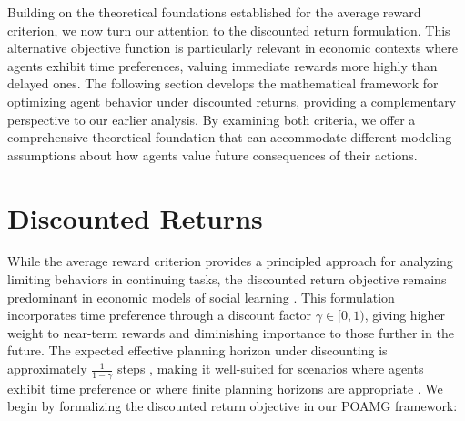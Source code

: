 \documentclass[a4paper,12pt]{report}
\begin{document}
Building on the theoretical foundations established for the average reward criterion, we now turn our attention to the discounted return formulation. This alternative objective function is particularly relevant in economic contexts where agents exhibit time preferences, valuing immediate rewards more highly than delayed ones. The following section develops the mathematical framework for optimizing agent behavior under discounted returns, providing a complementary perspective to our earlier analysis. By examining both criteria, we offer a comprehensive theoretical foundation that can accommodate different modeling assumptions about how agents value future consequences of their actions.

\section{Discounted Returns}

While the average reward criterion provides a principled approach for analyzing limiting behaviors in continuing tasks, the discounted return objective remains predominant in economic models of social learning \citep{keller2005strategic, bolton1999strategic, huang2024learning,brandl2024}. This formulation incorporates time preference through a discount factor $\gamma \in [0, 1)$, giving higher weight to near-term rewards and diminishing importance to those further in the future. The expected effective planning horizon under discounting is approximately $\frac{1}{1-\gamma}$ steps \citep{kearns2002near}, making it well-suited for scenarios where agents exhibit time preference or where finite planning horizons are appropriate \citep{frederick2002time, sutton2018reinforcement}. We begin by formalizing the discounted return objective in our POAMG framework:
\end{document}
